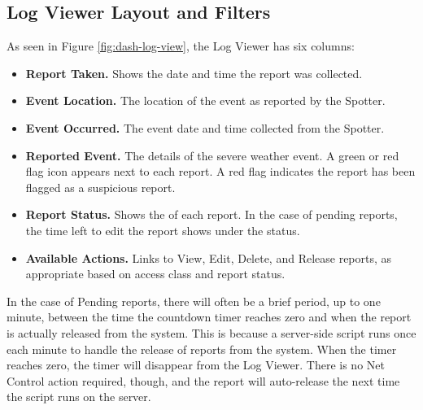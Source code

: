 \documentclass[pdflatex,letterpaper,twoside,12pt]{book}
\begin{document}
\subsection{Log Viewer Layout and Filters}\label{log-layout-filters}

As seen in Figure \ref{fig:dash-log-view}, the Log Viewer has six columns:

\begin{itemize}
\item \textbf{Report Taken.}  Shows the date and time the report was collected.
\item \textbf{Event Location.}  The location of the event as reported by the Spotter.
\item \textbf{Event Occurred.}  The event date and time collected from the Spotter.
\item \textbf{Reported Event.}  The details of the severe weather event.  A green or red flag icon appears next to each report.  A red flag indicates the report has been flagged as a suspicious report.
\item \textbf{Report Status.}  Shows the  of each report.  In the case of pending reports, the time left to edit the report shows under the status.
\item \textbf{Available Actions.}  Links to View, Edit, Delete, and Release reports, as appropriate based on access class and report status.
\end{itemize}


In the case of Pending reports, there will often be a brief period, up to one minute, between the time the countdown timer reaches zero and when the report is actually released from the system.  This is because a server-side script runs once each minute to handle the release of reports from the system.  When the timer reaches zero, the timer will disappear from the Log Viewer.  There is no Net Control action required, though, and the report will auto-release the next time the script runs on the server.
\end{document}
